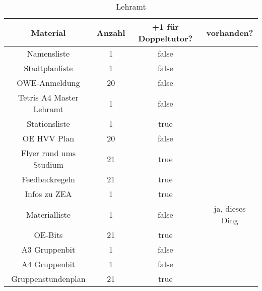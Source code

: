 \documentclass[10pt,a4paper,oneside,ngerman,numbers=noenddot]{scrartcl}
\begin{document}
\begin{table}[ht]
	\caption{Lehramt}
	\begin{tabular}{c|c|c|c}
		\textbf{Material} & \textbf{Anzahl} & \textbf{+1 für Doppeltutor?} & \textbf{vorhanden?} \\
		\hline
		Namensliste & 1 & false & \\
		\hline
		Stadtplanliste & 1 & false & \\
		\hline
		OWE-Anmeldung & 20 & false & \\
		\hline
		Tetris A4 Master Lehramt & 1 & false & \\
		\hline
		Stationsliste & 1 & true & \\
		\hline
		OE HVV Plan & 20 & false & \\
		\hline
		Flyer rund ums Studium & 21 & true & \\
		\hline
		Feedbackregeln & 21 & true & \\
		\hline
		Infos zu ZEA & 1 & true & \\
		\hline
		Materialliste & 1 & false & ja, dieses Ding \\
		\hline
		OE-Bits & 21 & true & \\
		\hline
		A3 Gruppenbit & 1 & false & \\
		\hline
		A4 Gruppenbit & 1 & false & \\
		\hline
		Gruppenstundenplan & 21 & true &
	\end{tabular}
\end{table}
\end{document}
